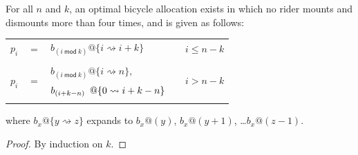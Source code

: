 \documentclass[DIV=calc, paper=a4, fontsize=11pt, twocolumn]{scrartcl}	 %
\begin{document}
\begin{theorem}
For all $n$ and $k$, an optimal bicycle allocation exists in which no rider mounts and dismounts more than four times, and is given as follows:
\newcommand\open{\{}
\newcommand\close{\}}
\begin{center}
\begin{tabular}{rclll}
	$p_i$ & $=$ & $b_{(i~\mathsf{mod}~k)}@ \open i \rightsquigarrow i+k \close$ && $i \le n-k$ \\
	\\
	\multirow{2}{*}{$p_i$} & \multirow{2}{*}{$=$} & $b_{(i~\mathsf{mod}~k)}@ \open i\rightsquigarrow n \close,$ && \multirow{2}{*}{$i > n-k$} \\
	& & $b_{(i+k-n)}\hspace{0.5em}@ \open 0 \rightsquigarrow i+k-n \close$ \\
	\\
\end{tabular}
\end{center}
where $b_x@\open y\rightsquigarrow z\close$ expands to $b_x@(y)$, $b_x@(y+1)$, \dots $b_x@(z-1)$.

\end{theorem}
\begin{proof}
By induction on $k$.
\end{proof}
\end{document}
